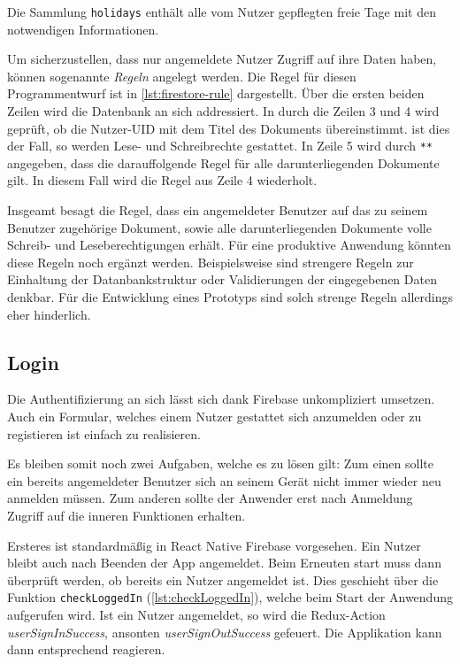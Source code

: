 Die Sammlung \texttt{holidays} enthält alle vom Nutzer gepflegten freie Tage mit den notwendigen Informationen.

Um sicherzustellen, dass nur angemeldete Nutzer Zugriff auf ihre Daten haben,
können sogenannte \textit{Regeln} angelegt werden.
Die Regel für diesen Programmentwurf ist in \autoref{lst:firestore-rule} dargestellt.
Über die ersten beiden Zeilen wird die Datenbank an sich addressiert.
In durch die Zeilen 3 und 4 wird geprüft, ob die Nutzer-UID mit dem Titel des Dokuments übereinstimmt.
ist dies der Fall, so werden Lese- und Schreibrechte gestattet.
In Zeile 5 wird durch \lstinline[language=firestoreRule]{**} angegeben,
dass die darauffolgende Regel für alle darunterliegenden Dokumente gilt.
In diesem Fall wird die Regel aus Zeile 4 wiederholt.




Insgeamt besagt die Regel,
dass ein angemeldeter Benutzer auf das zu seinem Benutzer zugehörige Dokument,
sowie alle darunterliegenden Dokumente volle Schreib- und Leseberechtigungen erhält.
Für eine produktive Anwendung könnten diese Regeln noch ergänzt werden.
Beispielsweise sind strengere Regeln zur Einhaltung der Datanbankstruktur oder Validierungen der eingegebenen Daten denkbar.
Für die Entwicklung eines Prototyps sind solch strenge Regeln allerdings eher hinderlich.


\subsection{Login}
Die Authentifizierung an sich lässt sich dank Firebase unkompliziert umsetzen.
Auch ein Formular, welches einem Nutzer gestattet sich anzumelden oder zu registieren ist einfach zu realisieren.

Es bleiben somit noch zwei Aufgaben, welche es zu lösen gilt:
Zum einen sollte ein bereits angemeldeter Benutzer sich an seinem Gerät nicht immer wieder neu anmelden müssen.
Zum anderen sollte der Anwender erst nach Anmeldung Zugriff auf die inneren Funktionen erhalten.

Ersteres ist standardmäßig in React Native Firebase vorgesehen.
Ein Nutzer bleibt auch nach Beenden der App angemeldet.
Beim Erneuten start muss dann überprüft werden, ob bereits ein Nutzer angemeldet ist.
Dies geschieht über die Funktion \texttt{checkLoggedIn} (\autoref{lst:checkLoggedIn}),
welche beim Start der Anwendung aufgerufen wird.
Ist ein Nutzer angemeldet, so wird die Redux-Action \emph{userSignInSuccess},
ansonten \emph{userSignOutSuccess} gefeuert.
Die Applikation kann dann entsprechend reagieren.

